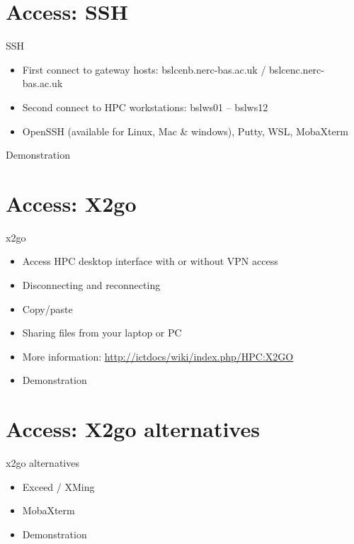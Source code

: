 {
\section{Access: SSH}
%
\begin{frame}{SSH}
\begin{itemize}
\item First connect to gateway hosts: bslcenb.nerc-bas.ac.uk / bslcenc.nerc-bas.ac.uk
\item Second connect to HPC workstations: bslws01 – bslws12
\item OpenSSH (available for Linux, Mac & windows), Putty, WSL, MobaXterm
\end{itemize}
\text Demonstration
\end{frame}
}

{
\section{Access: X2go}
%
\begin{frame}{x2go}
\begin{itemize}
\item Access HPC desktop interface with or without VPN access
\item Disconnecting and reconnecting
\item Copy/paste
\item Sharing files from your laptop or PC
\item More information: \href{http://ictdocs/wiki/index.php/HPC:X2GO}{http://ictdocs/wiki/index.php/HPC:X2GO}
\pause
\item{{\color{red}Demonstration}}
\end{itemize}
\end{frame}
}

{
\section{Access: X2go alternatives}
%
\begin{frame}{x2go alternatives}
\begin{itemize}
\item Exceed / XMing
\item MobaXterm
\pause
\item{{\color{red}Demonstration}}
\end{itemize}
\end{frame}
}

